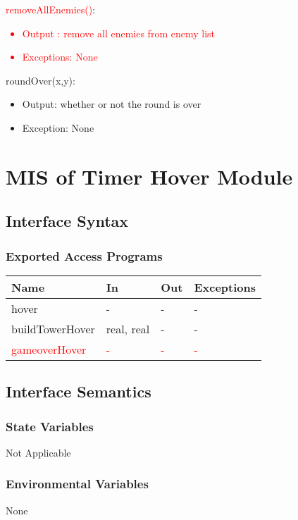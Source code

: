 \documentclass[12,english]{article}
\begin{document}
\noindent \textcolor{red}{removeAllEnemies()}:
\textcolor{red}{\begin{itemize}
    \item Output : remove all enemies from enemy list
    \item Exceptions: None
\end{itemize}}

\noindent roundOver(x,y):
\begin{itemize}
    \item Output: whether or not the round is over
    \item Exception: None
\end{itemize}

\newpage
\section{MIS of Timer Hover Module}
\subsection{Interface Syntax}
\subsubsection{Exported Access Programs}
\begin{table}[h!]
    \centering
    \begin{tabular}{|p{4cm}|p{2cm}|p{2cm}|p{2cm}|}
    \hline
    \textbf {Name}  & {In} & {Out} & {Exceptions} \\
    \hline
    hover & - & - & -\\
    \hline
    buildTowerHover& real, real & - & - \\
    \hline 
    \textcolor{red}{gameoverHover} & \textcolor{red}{-} & \textcolor{red}{-} & \textcolor{red}{-}\\
    \hline
    \end{tabular}
\end{table}

\subsection{Interface Semantics}
\subsubsection{State Variables}
Not Applicable
\subsubsection{Environmental Variables}
None
\end{document}
